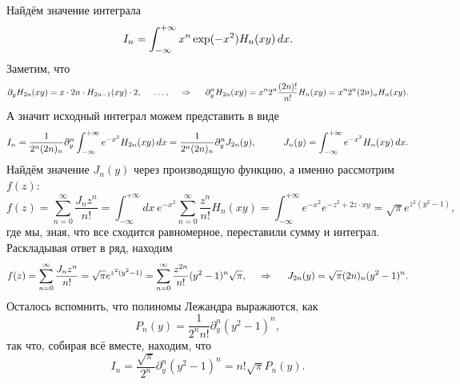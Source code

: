 Найдём значение интеграла
\begin{equation*}
    I_n = \int_{-\infty}^{+\infty} x^n \exp(-x^2) H_n (xy) \, d x.
\end{equation*}
Заметим, что
\begin{equation*}
    \partial_y H_{2n } (xy) = x \cdot 2n \cdot H_{2n-1} (xy) \cdot 2, 
    \hspace{5 mm} 
    \ldots,
    \hspace{0.5cm} \Rightarrow \hspace{0.5cm}
    \partial_y^n H_{2n} (xy) = x^n 2^n \frac{(2n)!}{n!} H_n (xy) = x^n 2^n (2n)_n H_n (xy).
\end{equation*}
А значит исходный интеграл можем представить в виде
\begin{equation*}
    I_n = \frac{1}{2^n (2n)_n} \partial_y^n \int_{-\infty}^{+\infty} e^{-x^2} H_{2n} (xy) \d x =
     \frac{1}{2^n (2n)_n} \partial_y^n J_{2n} (y),
     \hspace{10 mm} 
     J_{n}(y) = \int_{-\infty}^{+\infty} e^{-x^2} H_n (xy) \d x.
\end{equation*}
Найдём значение $J_{n}(y)$ через производящую функцию, а именно рассмотрим $f(z)$:
\begin{equation*}
    f(z) = \sum_{n=0}^{\infty} \frac{J_n z^n}{n!} = \int_{-\infty}^{+\infty} dx\, e^{-x^2} 
    \sum_{n=0}^{\infty} \frac{z^n}{n!} H_n (xy) = 
    \int_{-\infty}^{+\infty} e^{-x^2}  e^{-z^2 + 2 z \cdot xy} = \sqrt{\pi} e^{z^2 (y^2 - 1)},
\end{equation*}
где мы, зная, что все сходится равномерное, переставили сумму и интеграл. Раскладывая ответ в ряд, находим
\begin{equation*}
    f(z) =  \sum_{n=0}^{\infty} \frac{J_n z^n}{n!}= \sqrt{\pi} e^{z^2 (y^2 - 1)} = \sum_{n=0}^{\infty} \frac{z^{2n}}{n!} (y^2-1)^n \sqrt{\pi},
    \hspace{0.5cm} \Rightarrow \hspace{0.5cm}
    J_{2n} (y) = \sqrt{\pi} (2n)_n (y^2-1)^n.
\end{equation*}
Осталось вспомнить, что полиномы Лежандра выражаются, как
\begin{equation*}
    P_n (y) = \frac{1}{2^n n!} \partial_y^n (y^2-1)^n,
\end{equation*}
так что, собирая всё вместе, находим, что
\begin{equation*}
    I_n = \frac{\sqrt{\pi} }{2^n} \partial_y^n (y^2 -1)^n = n! \sqrt{\pi} P_n (y).
\end{equation*}